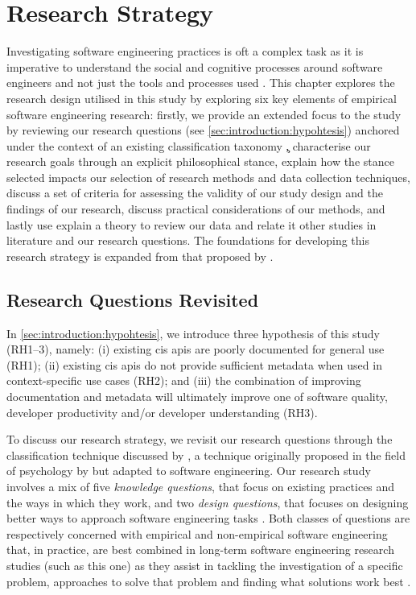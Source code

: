 \chapter{Research Strategy}

Investigating software engineering practices is oft a complex task as it is imperative to understand the social and cognitive processes around software engineers and not just the tools and processes used \citep{Easterbrook:2007ws}. This chapter explores the research design utilised in this study by exploring six key elements of empirical software engineering research: firstly, we provide an extended focus to the study by reviewing our research questions (see \cref{sec:introduction:hypohtesis}) anchored under the context of an existing classification taxonomy \c, characterise our research goals through an explicit philosophical stance, explain how the stance selected impacts our selection of research methods and data collection techniques, discuss a set of criteria for assessing the validity of our study design and the findings of our research, discuss practical considerations of our methods, and lastly use explain a theory to review our data and relate it other studies in literature and our research questions. The foundations for developing this research strategy is expanded from that proposed by \citet{Easterbrook:2007ws}.


\section{Research Questions Revisited}

In \cref{sec:introduction:hypohtesis}, we introduce three hypothesis of this study (RH1--3), namely: (i) existing \gls{cis} \glspl{api} are poorly documented for general use (RH1); (ii) existing \gls{cis} \glspl{api} do not provide sufficient metadata when used in context-specific use cases (RH2); and (iii) the combination of improving documentation and metadata will ultimately improve one of software quality, developer productivity and/or developer understanding (RH3).

To discuss our research strategy, we revisit our research questions through the classification technique discussed by \citet{Easterbrook:2007ws}, a technique originally proposed in the field of psychology by \citet{Meltzoff:1998wg} but adapted to software engineering. Our research study involves a mix of five \textit{knowledge questions}, that focus on existing practices and the ways in which they work, and two \textit{design questions}, that focuses on designing better ways to approach software engineering tasks \citep{Simon:1996uw}. Both classes of questions are respectively concerned with empirical and non-empirical software engineering that, in practice, are best combined in long-term software engineering research studies (such as this one) as they assist in tackling the investigation of a specific problem, approaches to solve that problem and finding what solutions work best \citep{Wieringa:2006vd}.

